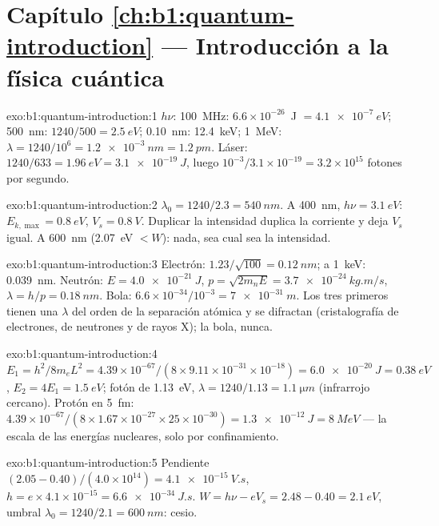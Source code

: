 \section*{Capítulo \ref{ch:b1:quantum-introduction} --- Introducción a la física cuántica}

\begin{solution}{exo:b1:quantum-introduction:1}
$h\nu$: \qty{100}{MHz}: $6.6 \times 10^{-26}$~J $= \qty{4.1e-7}{eV}$; \qty{500}{nm}:
$1240/500 = \qty{2.5}{eV}$; \qty{0.10}{nm}: \qty{12.4}{keV}; \qty{1}{MeV}: $\lambda =
1240/10^6 = \qty{1.2e-3}{nm} = \qty{1.2}{pm}$. Láser: $1240/633 = \qty{1.96}{eV} =
\qty{3.1e-19}{J}$, luego $10^{-3}/3.1 \times 10^{-19} = 3.2 \times 10^{15}$ fotones por
segundo.
\end{solution}

\begin{solution}{exo:b1:quantum-introduction:2}
$\lambda_0 = 1240/2.3 = \qty{540}{nm}$. A \qty{400}{nm}, $h\nu = \qty{3.1}{eV}$:
$E_{k,\max} = \qty{0.8}{eV}$, $V_s = \qty{0.8}{V}$. Duplicar la intensidad
duplica la corriente y deja $V_s$ igual. A \qty{600}{nm}
(\qty{2.07}{eV} $< W$): nada, sea cual sea la intensidad.
\end{solution}

\begin{solution}{exo:b1:quantum-introduction:3}
Electrón: $1.23/\sqrt{100} = \qty{0.12}{nm}$; a \qty{1}{keV}: \qty{0.039}{nm}.
Neutrón: $E = \qty{4.0e-21}{J}$, $p = \sqrt{2m_nE} = \qty{3.7e-24}{kg.m/s}$,
$\lambda = h/p = \qty{0.18}{nm}$. Bola: $6.6 \times 10^{-34}/10^{-3} = \qty{7e-31}{m}$.
Los tres primeros tienen una $\lambda$ del orden de la separación atómica y se
difractan (cristalografía de electrones, de neutrones y de rayos X); la bola, nunca.
\end{solution}

\begin{solution}{exo:b1:quantum-introduction:4}
$E_1 = h^2/8m_eL^2 = 4.39 \times 10^{-67}/(8 \times 9.11 \times 10^{-31} \times 10^{-18}) =
\qty{6.0e-20}{J} = \qty{0.38}{eV}$, $E_2 = 4E_1 = \qty{1.5}{eV}$; fotón de
\qty{1.13}{eV}, $\lambda = 1240/1.13 = \qty{1.1}{\micro m}$ (infrarrojo cercano). Protón
en \qty{5}{fm}: $4.39 \times 10^{-67}/(8 \times 1.67 \times 10^{-27} \times 25 \times 10^{-30}) =
\qty{1.3e-12}{J} = \qty{8}{MeV}$ --- la escala de las energías nucleares,
solo por confinamiento.
\end{solution}

\begin{solution}{exo:b1:quantum-introduction:5}
Pendiente $(2.05 - 0.40)/(4.0 \times 10^{14}) = \qty{4.1e-15}{V.s}$, $h = e \times 4.1 \times
10^{-15} = \qty{6.6e-34}{J.s}$. $W = h\nu - eV_s = 2.48 - 0.40 = \qty{2.1}{eV}$,
umbral $\lambda_0 = 1240/2.1 = \qty{600}{nm}$: cesio.
\end{solution}


